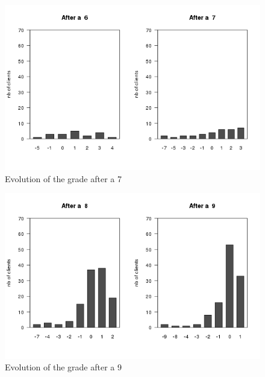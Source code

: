 \documentclass[a4paper, 11pt]{article}
\begin{document}
    \begin{figure}[!ht]
            \centering
            \includegraphics[height = 10 cm]{Remi/Evolution_of_the_grade_after_a_7.png}
            \caption{Evolution of the grade after a 7}
            \label{fig:e_7}
    \end{figure}

    \begin{figure}[!ht]
            \centering
            \includegraphics[height = 10 cm]{Remi/Evolution_of_the_grade_after_a_9.png}
            \caption{Evolution of the grade after a 9}
            \label{fig:e_9}
    \end{figure}
\end{document}
